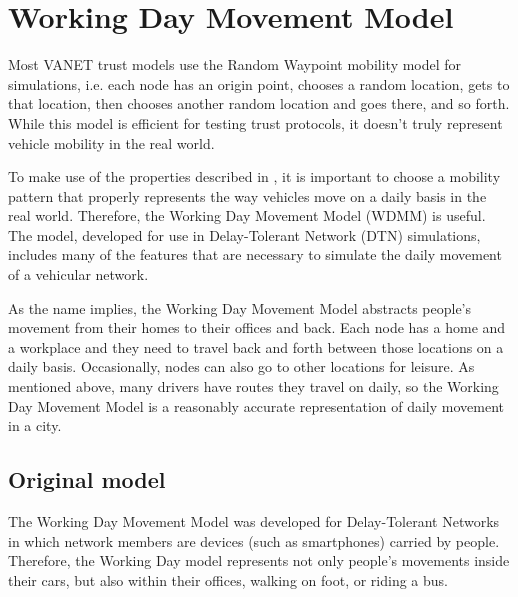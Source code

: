 \section{Working Day Movement Model}
\label{section:workingday}

Most VANET trust models use the Random Waypoint mobility model for simulations, i.e. each node has an origin point, chooses a random location, gets to that location, then chooses another random location and goes there, and so forth.
While this model is efficient for testing trust protocols, it doesn't truly represent vehicle mobility in the real world.

To make use of the properties described in , it is important to choose a mobility pattern that properly represents the way vehicles move on a daily basis in the real world.
Therefore, the Working Day Movement Model \citep{ekman2008working} (WDMM) is useful.
The model, developed for use in Delay-Tolerant Network (DTN) simulations, includes many of the features that are necessary to simulate the daily movement of a vehicular network.

As the name implies, the Working Day Movement Model abstracts people's movement from their homes to their offices and back.
Each node has a home and a workplace and they need to travel back and forth between those locations on a daily basis.
Occasionally, nodes can also go to other locations for leisure.
As mentioned above, many drivers have routes they travel on daily, so the Working Day Movement Model is a reasonably accurate representation of daily movement in a city.

\subsection{Original model}
The Working Day Movement Model was developed for Delay-Tolerant Networks in which network members are devices (such as smartphones) carried by people.
Therefore, the Working Day model represents not only people's movements inside their cars, but also within their offices, walking on foot, or riding a bus.

